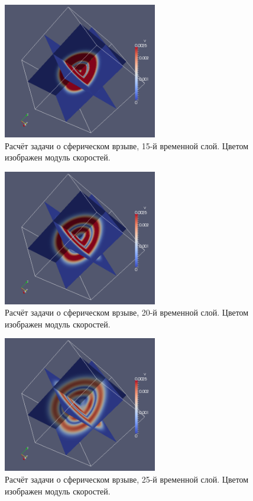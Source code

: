 \begin{figure}[htp]
\centering
\includegraphics[width=0.6\textwidth]{png/spherical-explosion-test/v-scalar/0015.png}
\caption{Расчёт задачи о сферическом врзыве, 15-й временной слой. Цветом изображен модуль скоростей.}
\end{figure}

\begin{figure}[htp]
\centering
\includegraphics[width=0.6\textwidth]{png/spherical-explosion-test/v-scalar/0020.png}
\caption{Расчёт задачи о сферическом врзыве, 20-й временной слой. Цветом изображен модуль скоростей.}
\end{figure}

\begin{figure}[htp]
\centering
\includegraphics[width=0.6\textwidth]{png/spherical-explosion-test/v-scalar/0025.png}
\caption{Расчёт задачи о сферическом врзыве, 25-й временной слой. Цветом изображен модуль скоростей.}
\end{figure}

